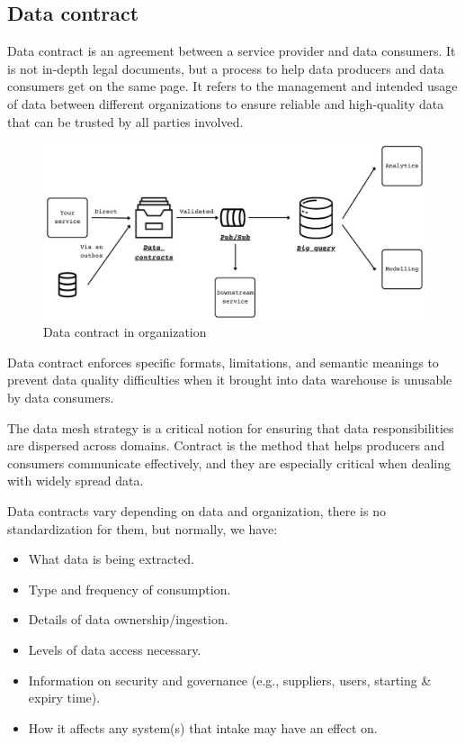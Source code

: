 \documentclass[12pt, a4paper]{book}
\begin{document}
\subsection{Data contract}
Data contract is an agreement between a service provider and data consumers. It is not in-depth legal documents, but a process to help data producers and data consumers get on the same page. It refers to the management and intended usage of data between different organizations to ensure reliable and high-quality data that can be trusted by all parties involved. \cite{contract}

\begin{figure}[h]
	\begin{framed}
		\centering
		\includegraphics[width=13cm]{datacontract.png}
		\caption{Data contract in organization}
		\label{datacontract}
	\end{framed}
\end{figure}

Data contract enforces specific formats, limitations, and semantic meanings to prevent data quality difficulties when it brought into data warehouse is unusable by data consumers.

The data mesh strategy is a critical notion for ensuring that data responsibilities are dispersed across domains. Contract is the method that helps producers and consumers communicate effectively, and they are especially critical when dealing with widely spread data.

Data contracts vary depending on data and organization, there is no standardization for them, but normally, we have:
	\begin{itemize}[nosep]
		\item What data is being extracted.
		\item Type and frequency of consumption.
		\item Details of data ownership/ingestion.
		\item Levels of data access necessary.
		\item Information on security and governance (e.g., suppliers, users, starting \& expiry time).
		\item How it affects any system(s) that intake may have an effect on.
	\end{itemize}
\end{document}
